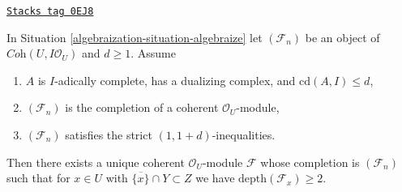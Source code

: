 \begin{lemma}
\label{algebraization-lemma-construct-unique}
\href{https://stacks.math.columbia.edu/tag/0EJ8}{\texttt{Stacks tag 0EJ8}}

In Situation \ref{algebraization-situation-algebraize} let $(\mathcal{F}_n)$ be an
object of $\textit{Coh}(U, I\mathcal{O}_U)$ and $d \geq 1$. Assume
\begin{enumerate}
\item $A$ is $I$-adically complete, has a dualizing complex, and
$\text{cd}(A, I) \leq d$,
\item $(\mathcal{F}_n)$ is the completion of a coherent $\mathcal{O}_U$-module,
\item $(\mathcal{F}_n)$ satisfies the strict $(1, 1 + d)$-inequalities.
\end{enumerate}
Then there exists a unique coherent $\mathcal{O}_U$-module $\mathcal{F}$
whose completion is $(\mathcal{F}_n)$ such that for
$x \in U$ with $\overline{\{x\}} \cap Y \subset Z$
we have $\text{depth}(\mathcal{F}_x) \geq 2$.
\end{lemma}

